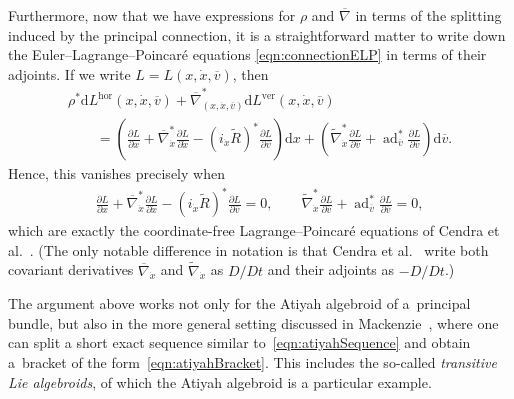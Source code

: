 \documentclass[10pt,a4paper]{amsart}
\numberwithin{equation}{section}
\begin{document}
 Furthermore, now that we have expressions for $ \rho $ and $ \overline{ \nabla } $ in terms of the splitting induced by the principal connection, it is a straightforward matter to write down the Euler--Lagrange--Poincar\'e equations \eqref{eqn:connectionELP} in terms of their adjoints. If we write $ L = L ( x, \dot{x}, \overline{ v } ) $, then
 \begin{gather*}
 \rho ^\ast \mathrm{d} L ^{ \text{hor} } ( x, \dot{x}, \overline{ v } ) + \overline{ \nabla } _{ ( x, \dot{x}, \overline{ v } ) } ^\ast \mathrm{d} L ^{ \text{ver} } ( x, \dot{x}, \overline{ v } ) \\
 \qquad{} = \left( \frac{ \partial L }{ \partial x } + \overline{ \nabla } _{ \dot{x} } ^\ast \frac{ \partial L }{ \partial \dot{x} } - ( i
 _{\dot{x}} \widetilde{ R } ) ^\ast \frac{ \partial L }{ \partial \overline{ v } } \right) \mathrm{d}x + \left( \widetilde{
 \nabla } _{ \dot{x} } ^\ast \frac{ \partial L }{ \partial \overline{ v } } + \operatorname{ad} _{ \overline{ v } } ^\ast
 \frac{ \partial L }{ \partial \overline{ v } } \right) \mathrm{d} \overline{ v } .
 \end{gather*}
 Hence, this vanishes precisely when
 \begin{gather*}
 \frac{ \partial L }{ \partial x } + \overline{ \nabla } _{ \dot{x} } ^\ast \frac{ \partial L }{ \partial \dot{x} } - ( i _{\dot{x}} \widetilde{ R } ) ^\ast \frac{ \partial L }{ \partial \overline{ v } } = 0 , \qquad \widetilde{ \nabla } _{ \dot{x} } ^\ast \frac{ \partial L }{ \partial
 \overline{ v } } + \operatorname{ad} _{ \overline{ v } } ^\ast \frac{ \partial L }{ \partial \overline{ v } } = 0 ,
 \end{gather*}
which are exactly the coordinate-free Lagrange--Poincar\'e equations of Cendra et al.~\cite[Theorem~3.4.1]{CeMaRa2001}. (The only notable dif\/ference
 in notation is that Cendra et al.~\cite{CeMaRa2001} write both covariant derivatives $ \overline{ \nabla } _{ \dot{x} } $ and $ \widetilde{ \nabla } _{ \dot{x} } $ as $ {D} / {D} t $ and their adjoints as $ - {D} / {D} t $.)

\begin{Remark} The argument above works not only for the Atiyah algebroid of a~principal bundle, but also in the more general setting discussed in Mackenzie~\cite[Chapter~7]{Mackenzie2005}, where one can split a short exact sequence similar to~\eqref{eqn:atiyahSequence} and obtain a~bracket of the form~\eqref{eqn:atiyahBracket}. This includes the so-called \emph{transitive Lie algebroids}, of which the Atiyah algebroid is a particular example.
\end{Remark}
\end{document}

